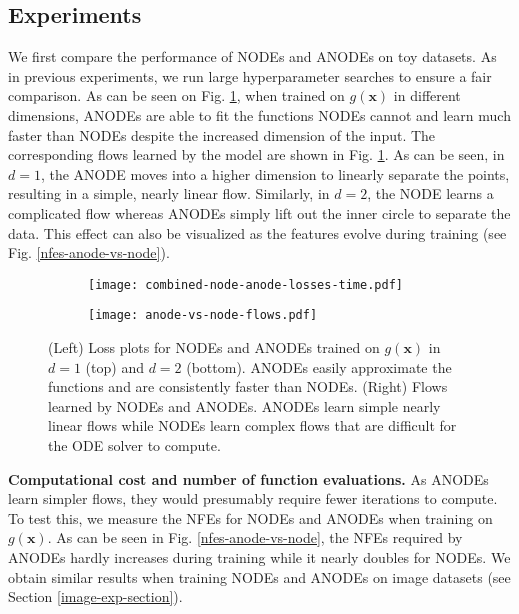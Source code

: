 \documentclass{article}
\begin{document}
\subsection{Experiments}\label{experiments-section}
We first compare the performance of NODEs and ANODEs on toy datasets. As in previous experiments, we run large hyperparameter searches to ensure a fair comparison. As can be seen on Fig. \ref{flows-losses-anode-vs-node}, when trained on $g(\mathbf{x})$ in different dimensions, ANODEs are able to fit the functions NODEs cannot and learn much faster than NODEs despite the increased dimension of the input. The corresponding flows learned by the model are shown in Fig. \ref{flows-losses-anode-vs-node}. As can be seen, in $d=1$, the ANODE moves into a higher dimension to linearly separate the points, resulting in a simple, nearly linear flow. Similarly, in $d=2$, the NODE learns a complicated flow whereas ANODEs simply lift out the inner circle to separate the data. This effect can also be visualized as the features evolve during training (see Fig. \ref{nfes-anode-vs-node}).
\begin{figure}[b]
\vspace{-12pt}
\centering
\begin{subfigure}[t]{0.31\linewidth}
\centering
\texttt{[image: combined-node-anode-losses-time.pdf]}
\end{subfigure}\hspace{0.1\linewidth}
\begin{subfigure}[t]{0.44\linewidth}
\centering
\texttt{[image: anode-vs-node-flows.pdf]}
\end{subfigure}\hspace{0.01\linewidth}
\caption{(Left) Loss plots for NODEs and ANODEs trained on $g(\mathbf{x})$ in $d=1$ (top) and $d=2$ (bottom). ANODEs easily approximate the functions and are consistently faster than NODEs. (Right) Flows learned by NODEs and ANODEs. ANODEs learn simple nearly linear flows while NODEs learn complex flows that are difficult for the ODE solver to compute.}
\label{flows-losses-anode-vs-node}
\end{figure}



\vspace{-10pt}
\textbf{Computational cost and number of function evaluations.} As ANODEs learn simpler flows, they would presumably require fewer iterations to compute. To test this, we measure the NFEs for NODEs and ANODEs when training on $g(\mathbf{x})$. As can be seen in Fig. \ref{nfes-anode-vs-node}, the NFEs required by ANODEs hardly increases during training while it nearly doubles for NODEs. We obtain similar results when training NODEs and ANODEs on image datasets (see Section \ref{image-exp-section}). 
\end{document}

